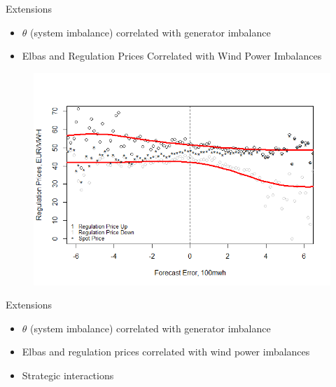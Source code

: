 \documentclass{beamer}
\begin{document}
\begin{frame}[plain]
	Extensions
	\begin{itemize}
	\item $\theta$ (system imbalance) correlated with generator imbalance
	\item Elbas and Regulation Prices Correlated with Wind Power Imbalances
	\end{itemize}
\end{frame}

\begin{frame}[plain]
	\begin{figure}
	\includegraphics[width=1\textwidth]{figures/RegulationPrices.png}
	\end{figure}
\end{frame}

\begin{frame}[plain]
	Extensions
	\begin{itemize}
	\item $\theta$ (system imbalance) correlated with generator imbalance
	\item Elbas and regulation prices correlated with wind power imbalances
	\item Strategic interactions
	\end{itemize}
\end{frame}
\end{document}

